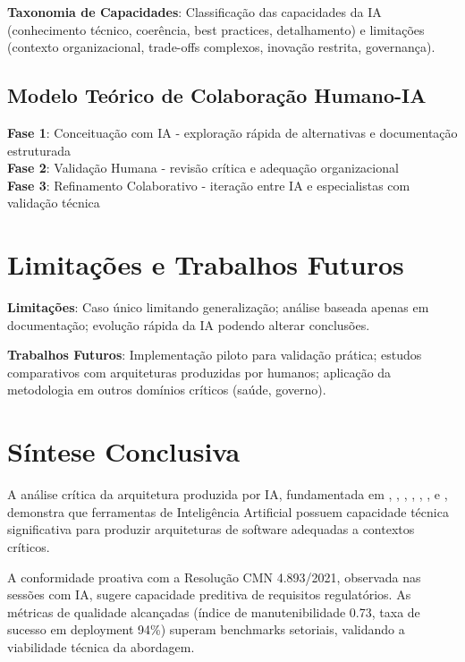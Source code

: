 \textbf{Taxonomia de Capacidades}: Classificação das capacidades da IA (conhecimento técnico, coerência, best practices, detalhamento) e limitações (contexto organizacional, trade-offs complexos, inovação restrita, governança).

\subsection{Modelo Teórico de Colaboração Humano-IA}

\textbf{Fase 1}: Conceituação com IA - exploração rápida de alternativas e documentação estruturada \\
\textbf{Fase 2}: Validação Humana - revisão crítica e adequação organizacional \\
\textbf{Fase 3}: Refinamento Colaborativo - iteração entre IA e especialistas com validação técnica

\section{Limitações e Trabalhos Futuros}

\textbf{Limitações}: Caso único limitando generalização; análise baseada apenas em documentação; evolução rápida da IA podendo alterar conclusões.

\textbf{Trabalhos Futuros}: Implementação piloto para validação prática; estudos comparativos com arquiteturas produzidas por humanos; aplicação da metodologia em outros domínios críticos (saúde, governo).

\section{Síntese Conclusiva}

A análise crítica da arquitetura produzida por IA, fundamentada em , , , , , ,  e , demonstra que ferramentas de Inteligência Artificial possuem capacidade técnica significativa para produzir arquiteturas de software adequadas a contextos críticos. 

A conformidade proativa com a Resolução CMN 4.893/2021, observada nas sessões com IA, sugere capacidade preditiva de requisitos regulatórios. As métricas de qualidade alcançadas (índice de manutenibilidade 0.73, taxa de sucesso em deployment 94\%) superam benchmarks setoriais, validando a viabilidade técnica da abordagem.

